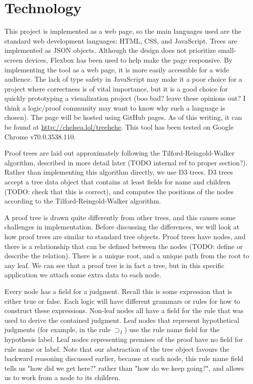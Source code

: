 \documentclass[conference]{IEEEtran}
\begin{document}
\section{Technology}
\label{sec:technology}

This project is implemented as a web page, so the main languages used are the standard web development languages: HTML, CSS, and JavaScript. Trees are implemented as JSON objects. Although the design does not prioritize small-screen devices, Flexbox has been used to help make the page responsive. By implementing the tool as a web page, it is more easily accessible for a wide audience. The lack of type safety in JavaScript may make it a poor choice for a project where correctness is of vital importance, but it is a good choice for quickly prototyping a visualization project (boo bad? leave these opinions out? I think a logic/proof community may want to know why such a language is chosen). The page will be hosted using GitHub pages. As of this writing, it can be found at \url{http://chelsea.lol/treehehe}. This tool has been tested on Google Chrome v70.0.3538.110.

Proof trees are laid out approximately following the Tilford-Reingold-Walker algorithm, described in more detail later (TODO internal ref to proper section?). Rather than implementing this algorithm directly, we use D3 trees. D3 trees accept a tree data object that contains at least fields for name and children (TODO: check that this is correct), and computes the positions of the nodes according to the Tilford-Reingold-Walker algorithm.

A proof tree is drawn quite differently from other trees, and this causes some challenges in implementation. Before discussing the differences, we will look at how proof trees are similar to standard tree objects. Proof trees have nodes, and there is a relationship that can be defined between the nodes (TODO: define or describe the relation). There is a unique root, and a unique path from the root to any leaf. We can see that a proof tree is in fact a tree, but in this specific application we attach some extra data to each node.

Every node has a field for a judgment. Recall this is some expression that is either true or false. Each logic will have different grammars or rules for how to construct these expressions. Non-leaf nodes all have a field for the rule that was used to derive the contained judgment. Leaf nodes that represent hypothetical judgments (for example, in the rule $\supset_I$) use the rule name field for the hypothesis label. Leaf nodes representing premises of the proof have no field for rule name or label. Note that our abstraction of the tree object favours the backward reasoning discussed earlier, because at each node, this rule name field tells us "how did we get here?" rather than "how do we keep going?", and allows us to work from a node to its children.
\end{document}
